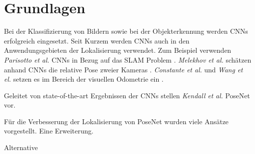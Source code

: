 \pagebreak
\section{Grundlagen}




\pagebreak
Bei der Klassifizierung von Bildern \cite{krizhevskyImageNetClassificationDeep2012, simonyanVeryDeepConvolutional2014, heDeepResidualLearning2015} sowie bei der  Objekterkennung \cite{girshickRichFeatureHierarchies2013, renFasterRCNNRealTime2015b, girshickFastRCNN2015} werden CNNs erfolgreich eingesetzt.
Seit Kurzem werden CNNs auch in den Anwendungsgebieten der Lokalisierung verwendet. Zum Beispiel verwenden \textit{Parisotto et al.} CNNs in Bezug auf das SLAM Problem \cite{parisottoGlobalPoseEstimation2018}. \textit{Melekhov et al.} schätzen anhand CNNs die relative Pose zweier Kameras \cite{melekwashovRelativeCameraPose2017}. \textit{Constante et al.} und \textit{Wang et el.} setzen es im Bereich der visuellen Odometrie ein \cite{costanteExploringRepresentationLearning2016, wangDeepVOEndtoendVisual2017}.

Geleitet von state-of-the-art Ergebnissen der CNNs stellen \textit{Kendall et al.} PoseNet vor.

Für die Verbesserung der Lokalisierung von PoseNet wurden viele Ansätze vorgestellt. Eine Erweiterung.


Alternative 



% 
